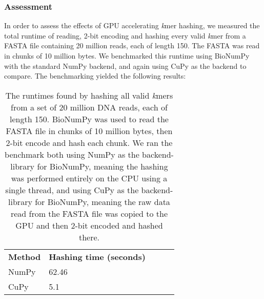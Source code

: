 \subsubsection{Assessment}
In order to assess the effects of GPU accelerating \textit{k}mer hashing, we measured the total runtime of reading, 2-bit encoding and hashing every valid \textit{k}mer from a FASTA file containing 20 million reads, each of length 150.
The FASTA was read in chunks of 10 million bytes.
We benchmarked this runtime using BioNumPy with the standard NumPy backend, and again using CuPy as the backend to compare.
The benchmarking yielded the following results:
\begin{table}[H]
\begin{center}
\begin{tabular}{lllll}
\multicolumn{1}{l|}{\textbf{Method}} & \multicolumn{1}{l}{\textbf{Hashing time (seconds)}} &  \\ \cline{1-2}
\multicolumn{1}{l|}{NumPy} & \multicolumn{1}{l}{62.46} &  \\
\multicolumn{1}{l|}{CuPy} & \multicolumn{1}{l}{5.1} &  \\
\end{tabular}
\end{center}
\caption{
  The runtimes found by hashing all valid \textit{k}mers from a set of 20 million DNA reads, each of length 150.
  BioNumPy was used to read the FASTA file in chunks of 10 million bytes, then 2-bit encode and hash each chunk.
  We ran the benchmark both using NumPy as the backend-library for BioNumPy, meaning the hashing was performed entirely on the CPU using a single thread, and using CuPy as the backend-library for BioNumPy, meaning the raw data read from the FASTA file was copied to the GPU and then 2-bit encoded and hashed there.
}
\label{methods:gpu_accelerating_kmer_hashing:tables:benchmark}
\end{table}

